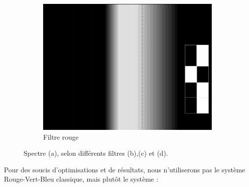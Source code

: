\begin{itemize}
\begin{figure}[H]
					    \begin{subfigure}[h]{0.3\textwidth}
					        \includegraphics[width=\textwidth]{Graphics/opencvR.jpg}
					        \caption{Filtre rouge}
					    \end{subfigure}

					    \caption{Spectre (a), selon différents filtres (b),(c) et (d).}
					\end{figure}

					Pour des soucis d'optimisations et de résultats, nous n'utiliserons pas le système Rouge-Vert-Bleu classique, mais plutôt le système \label{HSV} :


\end{itemize}
